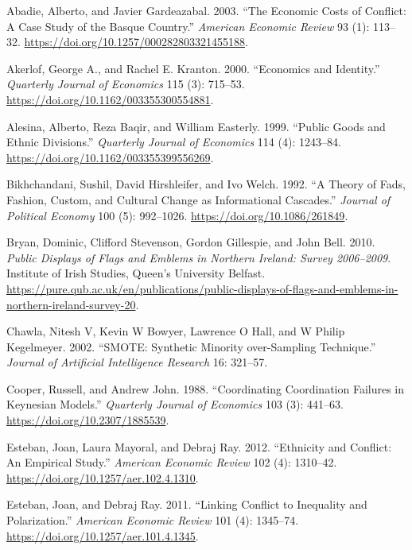 \documentclass[
  a4paper,
]{article}
\newlength{\cslhangindent}
\newenvironment{CSLReferences}[2] %
 {\begin{list}{}{%
  \setlength{\itemindent}{0pt}
  \setlength{\leftmargin}{0pt}
  \setlength{\parsep}{0pt}
  \ifodd #1
   \setlength{\leftmargin}{\cslhangindent}
   \setlength{\itemindent}{-1\cslhangindent}
  \fi
  \setlength{\itemsep}{#2\baselineskip}}}
 {\end{list}}
\begin{document}
\label{refs}
\begin{CSLReferences}{1}{0}
Abadie, Alberto, and Javier Gardeazabal. 2003. {``The Economic Costs of
Conflict: A Case Study of the Basque Country.''} \emph{American Economic
Review} 93 (1): 113--32.
\url{https://doi.org/10.1257/000282803321455188}.

Akerlof, George A., and Rachel E. Kranton. 2000. {``Economics and
Identity.''} \emph{Quarterly Journal of Economics} 115 (3): 715--53.
\url{https://doi.org/10.1162/003355300554881}.

Alesina, Alberto, Reza Baqir, and William Easterly. 1999. {``Public
Goods and Ethnic Divisions.''} \emph{Quarterly Journal of Economics} 114
(4): 1243--84. \url{https://doi.org/10.1162/003355399556269}.

Bikhchandani, Sushil, David Hirshleifer, and Ivo Welch. 1992. {``A
Theory of Fads, Fashion, Custom, and Cultural Change as Informational
Cascades.''} \emph{Journal of Political Economy} 100 (5): 992--1026.
\url{https://doi.org/10.1086/261849}.

Bryan, Dominic, Clifford Stevenson, Gordon Gillespie, and John Bell.
2010. \emph{Public Displays of Flags and Emblems in Northern Ireland:
Survey 2006--2009}. Institute of Irish Studies, Queen's University
Belfast.
\url{https://pure.qub.ac.uk/en/publications/public-displays-of-flags-and-emblems-in-northern-ireland-survey-20}.

Chawla, Nitesh V, Kevin W Bowyer, Lawrence O Hall, and W Philip
Kegelmeyer. 2002. {``{SMOTE}: Synthetic Minority over-Sampling
Technique.''} \emph{Journal of Artificial Intelligence Research} 16:
321--57.

Cooper, Russell, and Andrew John. 1988. {``Coordinating Coordination
Failures in Keynesian Models.''} \emph{Quarterly Journal of Economics}
103 (3): 441--63. \url{https://doi.org/10.2307/1885539}.

Esteban, Joan, Laura Mayoral, and Debraj Ray. 2012. {``Ethnicity and
Conflict: An Empirical Study.''} \emph{American Economic Review} 102
(4): 1310--42. \url{https://doi.org/10.1257/aer.102.4.1310}.

Esteban, Joan, and Debraj Ray. 2011. {``Linking Conflict to Inequality
and Polarization.''} \emph{American Economic Review} 101 (4): 1345--74.
\url{https://doi.org/10.1257/aer.101.4.1345}.


\end{CSLReferences}
\end{document}

